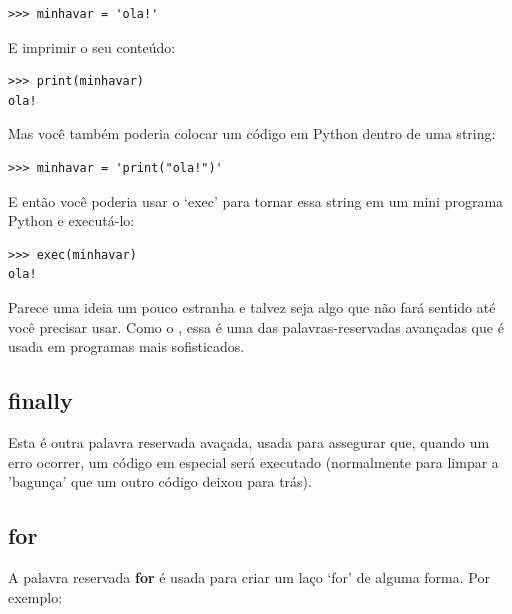 \begin{listing}
\begin{verbatim}
>>> minhavar = 'ola!'
\end{verbatim}
\end{listing}

\noindent
E imprimir o seu conteúdo:

\begin{listing}
\begin{verbatim}
>>> print(minhavar)
ola!
\end{verbatim}
\end{listing}

\noindent
Mas você também poderia colocar um código em Python dentro de uma string:

\begin{listing}
\begin{verbatim}
>>> minhavar = 'print("ola!")'
\end{verbatim}
\end{listing}

\noindent
E então você poderia usar o `exec' para tornar essa string em um mini programa Python e executá-lo:

\begin{listing}
\begin{verbatim}
>>> exec(minhavar)
ola!
\end{verbatim}
\end{listing}

Parece uma ideia um pouco estranha e talvez seja algo que não fará sentido até você precisar usar. Como o , essa é uma das palavras-reservadas avançadas que é usada em programas mais sofisticados.

\subsection*{finally}

Esta é outra palavra reservada avaçada, usada para assegurar que, quando um erro ocorrer, um código em especial será executado (normalmente para limpar a 'bagunça' que um outro código deixou para trás).

\subsection*{for}

A palavra reservada \textbf{for} é usada para criar um laço `for' de alguma forma. Por exemplo:


